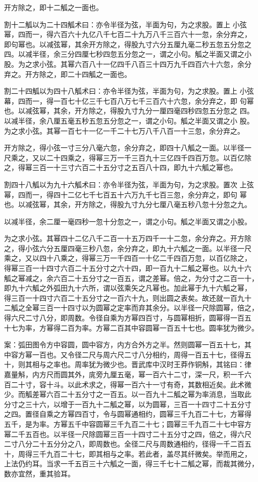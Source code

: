\documentclass[12pt,UTF8]{ctexbook}
\begin{document}
开方除之，即十二觚之一面也。

割十二觚以为二十四觚术曰：亦令半径为弦，半面为句，为之求股。置上 小弦幂，四而一，得六百六十九亿八千七百二十九万八千三百六十一忽，余分弃之， 即句幂也。以减弦幂，其余开方除之，得股九寸六分五厘九毫二秒五忽五分忽之 四。以减半径，余三分四厘七秒四忽五分忽之一，谓之小句。觚之半面又谓之小 股。为之求小弦。其幂六百八十一亿四千八百三十四万九千四百六十六忽，余分 弃之。开方除之，即二十四觚之一面也。

割二十四觚以为四十八觚术曰：亦令半径为弦，半面为句，为之求股。置上 小弦幕，四而一，得一百七十亿三千七百八万七千三百六十六忽，余分弃之，即 句幂也。以减弦幂，其余，开方除之，得股九寸九分一厘四毫四秒四忽五分忽之 四。以减半径，余八厘五毫五秒五忽五分忽之一，谓之小句。觚之半面又谓之小 股。为之求小弦。其幂一百七十一亿一千二十七万八千八百一十三忽，余分弃之。

开方除之，得小弦一寸三分八毫六忽，余分弃之，即四十八觚之一面。以半径一 尺乘之，又以二十四乘之，得幂三万一千三百九十三亿四千四百万忽。以百亿除 之，得幂三百一十三寸六百二十五分寸之五百八十四，即九十六觚之幂也。

割四十八觚以为九十六觚术曰：亦令半径为弦，半面为句，为之求股。置次 上弦幂，四而一，得四十二亿七千七百五十六万九千七百三忽，余分弃之，即句 幂也。以减弦幂，其余，开方除之，得股九寸九分七厘八毫五秒八忽十分忽之九。

以减半径，余二厘一毫四秒一忽十分忽之一，谓之小句。觚之半面又谓之小股。

为之求小弦。其幂四十二亿八千二百一十五万四千一十二忽，余分弃之。开方除 之，得小弦六分五厘四毫三秒八忽，余分弃之，即九十六觚之一面。以半径一尺 乘之，又以四十八乘之，得幂三万一千四百一十亿二千四百万忽，以百亿除之， 得幂三百一十四寸六百二十五分寸之六十四，即一百九十二觚之幂也。以九十六 觚之幂减之，余六百二十五分寸之一百五，谓之差幂。倍之，为分寸之二百一十， 即九十六觚之外弧田九十六所，谓以弦乘矢之凡幂也。加此幂于九十六觚之幂， 得三百一十四寸六百二十五分寸之一百六十九，则出圆之表矣。故还就一百九十 二觚之全幂三百一十四寸以为圆幂之定率而弃其余分。以半径一尺除圆幂，倍之， 得六尺二寸八分，即周数。令径自乘为方幂四百寸，与圆幂相折，圆幂得一百五 十七为率，方幂得二百为率。方幂二百其中容圆幂一百五十七也。圆率犹为微少。

案：弧田图令方中容圆，圆中容方，内方合外方之半。然则圆幂一百五十七，其 中容方幂一百也。又令径二尺与周六尺二寸八分相约，周得一百五十七，径得五 十，则其相与之率也。周率犹为微少也。晋武库中汉时王莽作铜斛，其铭曰：律 嘉量斛，内方尺而圆其外，庣旁九厘五毫，幂一百六十二寸，深一尺，积一千六 百二十寸，容十斗。以此术求之，得幂一百六十一寸有奇，其数相近矣。此术微 少。而觚差幂六百二十五分寸之一百五。以一百九十二觚之幂为率消息，当取此 分寸之三十六，以增于一百九十二觚之幂，以为圆幂，三百一十四寸二十五分寸 之四。置径自乘之方幂四百寸，令与圆幂通相约，圆幂三千九百二十七，方幂得 五千，是为率。方幂五千中容圆幂三千九百二十七；圆幂三千九百二十七中容方 幂二千五百也。以半径一尺除圆幂三百一十四寸二十五分寸之四，倍之，得六尺 二寸八分二十五分分之八，即周数也。全径二尺与周数通相约，径得一千二百五 十，周得三千九百二十七，即其相与之率。若此者，盖尽其纤微矣。举而用之， 上法仍约耳。当求一千五百三十六觚之一面，得三千七十二觚之幂，而裁其微分， 数亦宜然，重其验耳。
\end{document}
